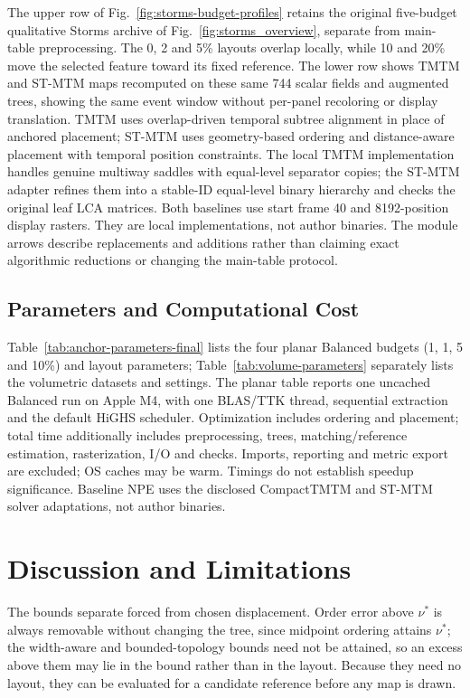 \documentclass[review]{vgtc}
\begin{document}
The upper row of Fig.~\ref{fig:storms-budget-profiles} retains the original five-budget qualitative Storms archive of Fig.~\ref{fig:storms_overview}, separate from main-table preprocessing. The 0, 2 and 5\% layouts overlap locally, while 10 and 20\% move the selected feature toward its fixed reference. The lower row shows TMTM and ST-MTM maps recomputed on these same 744 scalar fields and augmented trees, showing the same event window without per-panel recoloring or display translation. TMTM uses overlap-driven temporal subtree alignment in place of anchored placement; ST-MTM uses geometry-based ordering and distance-aware placement with temporal position constraints. The local TMTM implementation handles genuine multiway saddles with equal-level separator copies; the ST-MTM adapter refines them into a stable-ID equal-level binary hierarchy and checks the original leaf LCA matrices. Both baselines use start frame 40 and 8192-position display rasters. They are local implementations, not author binaries. The module arrows describe replacements and additions rather than claiming exact algorithmic reductions or changing the main-table protocol.

\subsection{Parameters and Computational Cost}
Table~\ref{tab:anchor-parameters-final} lists the four planar Balanced budgets (1, 1, 5 and 10\%) and layout parameters; Table~\ref{tab:volume-parameters} separately lists the volumetric datasets and settings. The planar table reports one uncached Balanced run on Apple M4, with one BLAS/TTK thread, sequential extraction and the default HiGHS scheduler. Optimization includes ordering and placement; total time additionally includes preprocessing, trees, matching/reference estimation, rasterization, I/O and checks. Imports, reporting and metric export are excluded; OS caches may be warm. Timings do not establish speedup significance. Baseline NPE uses the disclosed CompactTMTM and ST-MTM solver adaptations, not author binaries.

\section{Discussion and Limitations}
The bounds separate forced from chosen displacement. Order error above $\nu^*$ is always removable without changing the tree, since midpoint ordering attains $\nu^*$; the width-aware and bounded-topology bounds need not be attained, so an excess above them may lie in the bound rather than in the layout. Because they need no layout, they can be evaluated for a candidate reference before any map is drawn.
\end{document}
